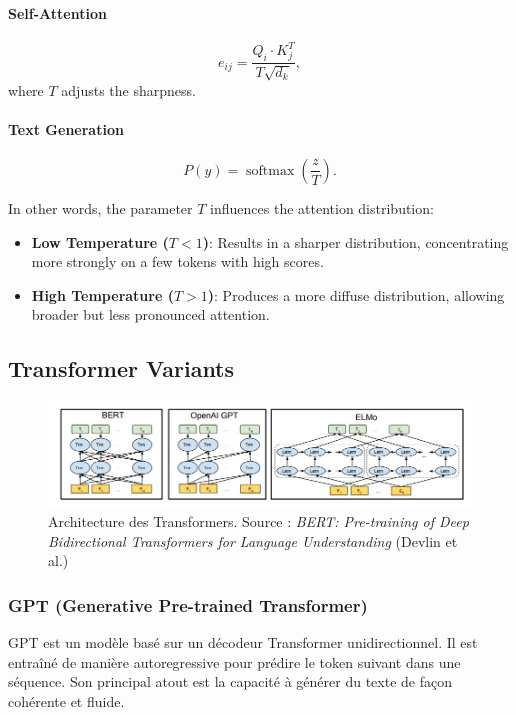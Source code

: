 \documentclass{article}
\begin{document}
\paragraph{Self-Attention}
\[
e_{ij} = \frac{Q_i \cdot K_j^T}{T\sqrt{d_k}},
\]
where \(T\) adjusts the sharpness.

\paragraph{Text Generation}
\[
P(y) = \operatorname{softmax}\left(\frac{z}{T}\right).
\]

In other words, the parameter \( T \) influences the attention distribution:
\begin{itemize}
    \item \textbf{Low Temperature (\( T < 1 \))}: Results in a sharper distribution, concentrating more strongly on a few tokens with high scores.
    \item \textbf{High Temperature (\( T > 1 \))}: Produces a more diffuse distribution, allowing broader but less pronounced attention.
\end{itemize}


\subsection{Transformer Variants}
\begin{figure}[h!]
    \centering
    \includegraphics[width=\linewidth]{graphics/transformers_architectures.jpg}
    \caption{Architecture des Transformers. Source : \textit{BERT: Pre-training of Deep Bidirectional Transformers for Language Understanding} (Devlin et al.)}
    \label{fig:transformers_architecture}
\end{figure}

\subsubsection{GPT (Generative Pre-trained Transformer)}
GPT est un modèle basé sur un décodeur Transformer unidirectionnel. Il est entraîné de manière autoregressive pour prédire le token suivant dans une séquence. Son principal atout est la capacité à générer du texte de façon cohérente et fluide.
\end{document}
